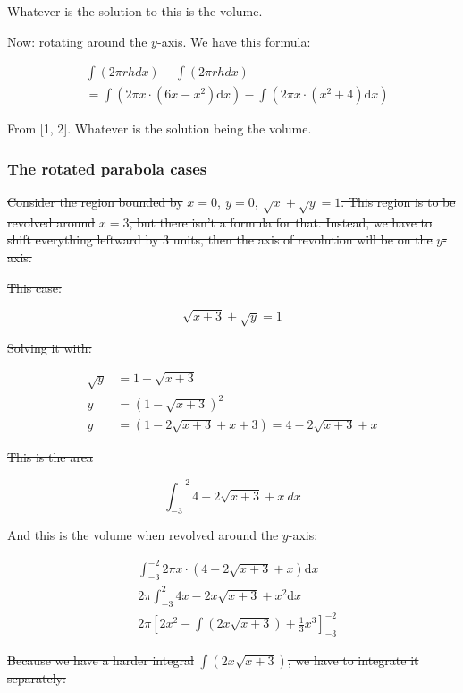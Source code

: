 \documentclass[12pt]{article}
\theoremstyle{plain}
\theoremstyle{remark}
\theoremstyle{definition}
\begin{document}
Whatever is the solution to this is the volume.

Now: rotating around the \(y\)-axis. We have this formula:

\begin{align*}
&\int(2\pi rhdx) - \int(2\pi rhdx) \\
&= \int\left( 2\pi x \cdot \left( 6x - x^{2} \right)\text{d}x \right) - \int\left( 2\pi x \cdot \left( x^{2} + 4 \right)\text{d}x \right)
\end{align*}


From {[}1, 2{]}. Whatever is the solution being the volume.


\subsubsection{The rotated parabola
cases}

\sout{Consider the region bounded by}
\(x = 0,\ y = 0,\ \sqrt{x} + \sqrt{y} = 1\)\sout{. This region is to be
revolved around} \(x = 3\)\sout{, but there isn't a formula for that.
Instead, we have to shift everything leftward by 3 units, then the axis
of revolution will be on the} \(y\)\sout{-axis.}

\sout{This case:}

\[\sqrt{x + 3} + \sqrt{y} = 1\]

\sout{Solving it with:}

\begin{align*}
\sqrt{y} &= 1 - \sqrt{x + 3} \\
y &= \left( 1 - \sqrt{x + 3} \right)^{2} \\
y &= \left( 1 - 2\sqrt{x + 3} + x + 3 \right) = 4 - 2\sqrt{x + 3} + x
\end{align*}


\sout{This is the area}

\[\int_{- 3}^{- 2}{4 - 2\sqrt{x + 3} + x\ dx}\]

\sout{And this is the volume when revolved around the}
\(y\)\sout{-axis:}

\begin{align*}
&\int_{- 3}^{- 2}{2\pi x \cdot \left( 4 - 2\sqrt{x + 3} + x \right)\text{d}x} \\
&2\pi\int_{- 3}^{2}{4x - 2x\sqrt{x + 3} + x^{2}\text{d}x} \\
&2\pi\left\lbrack 2x^{2} - \int\left( 2x\sqrt{x + 3} \right) + \frac{1}{3}x^{3} \right\rbrack_{- 3}^{- 2}
\end{align*}


\sout{Because we have a harder integral}
\(\int\left( 2x\sqrt{x + 3} \right)\)\sout{, we have to integrate it
separately:}
\end{document}
